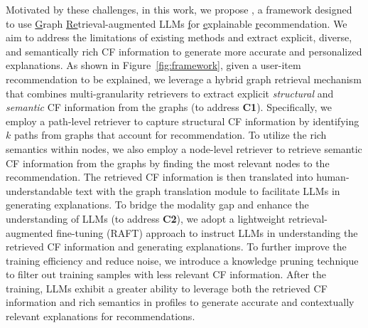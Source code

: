 

 Motivated by these challenges, in this work, we propose \underline{\model}, a framework designed to use \underline{G}raph \underline{Re}trieval-augmented LLMs \underline{f}or \underline{e}xplainable \underline{r}ecommendation. We aim to address the limitations of existing methods and extract explicit, diverse, and semantically rich CF information to generate more accurate and personalized explanations. As shown in Figure~\ref{fig:framework}, given a user-item recommendation to be explained, we leverage a hybrid graph retrieval mechanism that combines multi-granularity retrievers to extract explicit \textit{structural} and \textit{semantic} CF information from the graphs (to address \textbf{C1}). 
%
Specifically, we employ a path-level retriever to capture structural CF information by identifying $k$ paths from graphs that account for recommendation. To utilize the rich semantics within nodes, we also employ a node-level retriever to retrieve semantic CF information from the graphs by finding the most relevant nodes to the recommendation. The retrieved CF information is then translated into human-understandable text with the graph translation module to facilitate LLMs in generating explanations.
%
To bridge the modality gap and enhance the understanding of LLMs (to address \textbf{C2}), we adopt a lightweight retrieval-augmented fine-tuning (RAFT) approach to instruct LLMs in understanding the retrieved CF information and generating explanations. To further improve the training efficiency and reduce noise, we introduce a knowledge pruning technique to filter out training samples with less relevant CF information. After the training, LLMs exhibit a greater ability to leverage both the retrieved CF information and rich semantics in profiles to generate accurate and contextually relevant explanations for recommendations.

